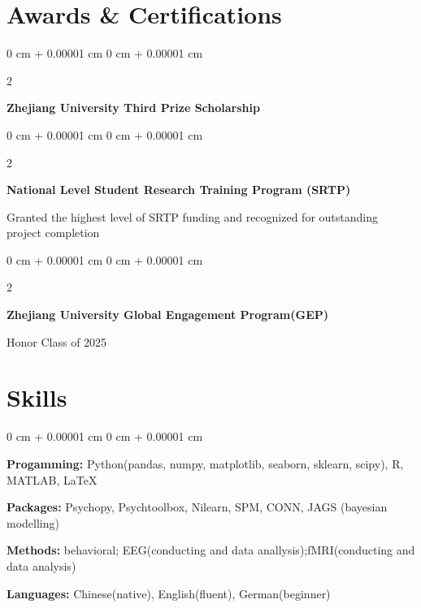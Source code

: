 \documentclass[10pt, letterpaper]{article}
\newenvironment{onecolentry}{
    \begin{adjustwidth}{
        0 cm + 0.00001 cm
    }{
        0 cm + 0.00001 cm
    }
}{
    \end{adjustwidth}
} %
\newenvironment{twocolentry}[2][]{
    \onecolentry
    \def\secondColumn{#2}
    \setcolumnwidth{\fill, 4.5 cm}
    \begin{paracol}{2}
}{
    \switchcolumn \raggedleft \secondColumn
    \end{paracol}
    \endonecolentry
} %
\begin{document}


\section{Awards \& Certifications }

        \vspace{0.2 cm}
        \begin{twocolentry}{
            2024
        }
            \textbf{Zhejiang University Third Prize Scholarship}\end{twocolentry}

        \vspace{0.1 cm}

        \begin{twocolentry}{
            2024
        }
            \textbf{National Level Student Research Training Program (SRTP)}\end{twocolentry}
            Granted the highest level of SRTP funding and recognized for outstanding project completion

        \vspace{0.1 cm}

        \begin{twocolentry}{
            2021
        }
            \textbf{Zhejiang University Global Engagement Program(GEP)}\end{twocolentry}
            Honor Class of 2025
        
\section{Skills}
        
        \begin{onecolentry}
            \item \textbf{Progamming:} Python(pandas, numpy, matplotlib, seaborn, sklearn, scipy), R, MATLAB, LaTeX
            \item \textbf{Packages:} Psychopy, Psychtoolbox, Nilearn, SPM, CONN, JAGS (bayesian modelling)
            \item \textbf{Methods:} behavioral; EEG(conducting and data anallysis);fMRI(conducting and data analysis)
            \item  \textbf{Languages:} Chinese(native), English(fluent), German(beginner)

        \end{onecolentry}
\end{document}
